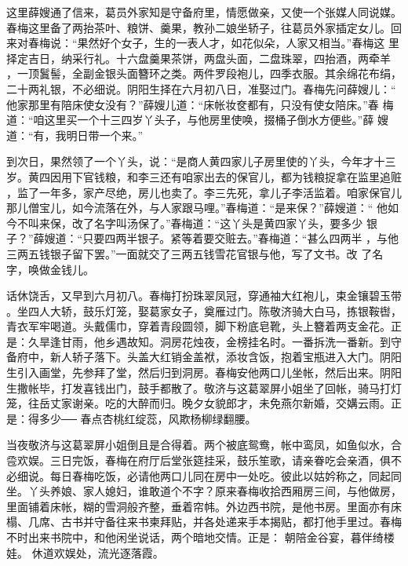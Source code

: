 这里薛嫂通了信来，葛员外家知是守备府里，情愿做亲，又使一个张媒人同说媒。
春梅这里备了两抬茶叶、粮饼、羹果，教孙二娘坐轿子，往葛员外家插定女儿。回
来对春梅说：“果然好个女子，生的一表人才，如花似朵，人家又相当。”春梅这
里择定吉日，纳采行礼。十六盘羹果茶饼，两盘头面，二盘珠翠，四抬酒，两牵羊
，一顶鬒髻，全副金银头面簪环之类。两件罗段袍儿，四季衣服。其余绵花布绢，
二十两礼银，不必细说。阴阳生择在六月初八日，准娶过门。春梅先问薛嫂儿：“
他家那里有陪床使女没有？”薛嫂儿道：“床帐妆奁都有，只没有使女陪床。”春
梅道：“咱这里买一个十三四岁丫头子，与他房里使唤，掇桶子倒水方便些。”薛
嫂道：“有，我明日带一个来。”

到次日，果然领了一个丫头，说：“是商人黄四家儿子房里使的丫头，今年才十三
岁。黄四因用下官钱粮，和李三还有咱家出去的保官儿，都为钱粮捉拿在监里追赃
，监了一年多，家产尽绝，房儿也卖了。李三先死，拿儿子李活监着。咱家保官儿
那儿僧宝儿，如今流落在外，与人家跟马哩。”春梅道：“是来保？”薛嫂道：“
他如今不叫来保，改了名字叫汤保了。”春梅道：“这丫头是黄四家丫头，要多少
银子？”薛嫂道：“只要四两半银子。紧等着要交赃去。”春梅道：“甚么四两半
，与他三两五钱银子留下罢。”一面就交了三两五钱雪花官银与他，写了文书。改
了名字，唤做金钱儿。

话休饶舌，又早到六月初八。春梅打扮珠翠凤冠，穿通袖大红袍儿，束金镶碧玉带
。坐四人大轿，鼓乐灯笼，娶葛家女子，奠雁过门。陈敬济骑大白马，拣银鞍辔，
青衣军牢喝道。头戴儒巾，穿着青段圆领，脚下粉底皂靴，头上簪着两支金花。正
是：久旱逢甘雨，他乡遇故知。洞房花烛夜，金榜挂名时。一番拆洗一番新。到守
备府中，新人轿子落下。头盖大红销金盖袱，添妆含饭，抱着宝瓶进入大门。阴阳
生引入画堂，先参拜了堂，然后归到洞房。春梅安他两口儿坐帐，然后出来。阴阳
生撒帐毕，打发喜钱出门，鼓手都散了。敬济与这葛翠屏小姐坐了回帐，骑马打灯
笼，往岳丈家谢亲。吃的大醉而归。晚夕女貌郎才，未免燕尔新婚，交媾云雨。正
是：得多少──
春点杏桃红绽蕊，风欺杨柳绿翻腰。

当夜敬济与这葛翠屏小姐倒且是合得着。两个被底鸳鸯，帐中鸾凤，如鱼似水，合
卺欢娱。三日完饭，春梅在府厅后堂张筵挂采，鼓乐笙歌，请亲眷吃会亲酒，俱不
必细说。每日春梅吃饭，必请他两口儿同在房中一处吃。彼此以姑妗称之，同起同
坐。丫头养娘、家人媳妇，谁敢道个不字？原来春梅收拾西厢房三间，与他做房，
里面铺着床帐，糊的雪洞般齐整，垂着帘帏。外边西书院，是他书房。里面亦有床
榻、几席、古书并守备往来书柬拜贴，并各处递来手本揭贴，都打他手里过。春梅
不时出来书院中，和他闲坐说话，两个暗地交情。正是：
朝陪金谷宴，暮伴绮楼娃。
休道欢娱处，流光逐落霞。